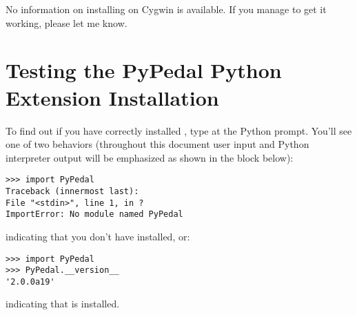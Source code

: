 No information on installing \PYPEDAL{} on Cygwin is available.  If you manage to get it working, please let me know.

\section{Testing the PyPedal Python Extension Installation}

To find out if you have correctly installed \PYPEDAL{}, type  at the Python prompt. You'll see one of two behaviors (throughout this document user input and Python interpreter output will be emphasized
as shown in the block below):
\begin{verbatim}
>>> import PyPedal
Traceback (innermost last):
File "<stdin>", line 1, in ?
ImportError: No module named PyPedal
\end{verbatim}
indicating that you don't have \PYPEDAL{} installed, or:
\begin{verbatim}
>>> import PyPedal
>>> PyPedal.__version__
'2.0.0a19'
\end{verbatim}
indicating that \PYPEDAL{} is installed.
